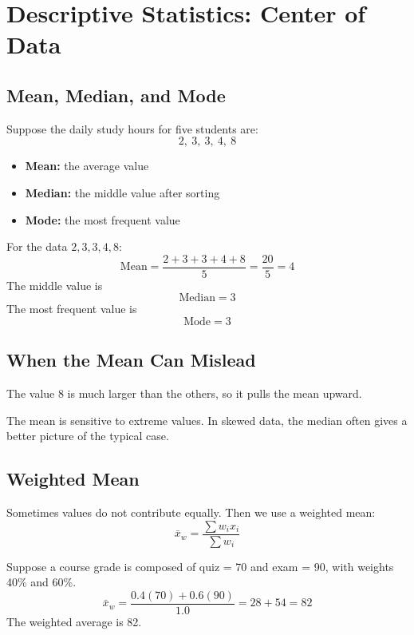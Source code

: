 \documentclass[11pt,a4paper]{article}
\begin{document}
\section{Descriptive Statistics: Center of Data}

\subsection{Mean, Median, and Mode}

Suppose the daily study hours for five students are:
\[
2,\ 3,\ 3,\ 4,\ 8
\]

\begin{itemize}[leftmargin=*]
  \item \textbf{Mean:} the average value
  \item \textbf{Median:} the middle value after sorting
  \item \textbf{Mode:} the most frequent value
\end{itemize}

\begin{examplebox}
For the data $2, 3, 3, 4, 8$:
\[
\text{Mean} = \frac{2+3+3+4+8}{5} = \frac{20}{5} = 4
\]
The middle value is
\[
\text{Median} = 3
\]
The most frequent value is
\[
\text{Mode} = 3
\]
\end{examplebox}

\subsection{When the Mean Can Mislead}

The value 8 is much larger than the others, so it pulls the mean upward.

\begin{alertbox}
The mean is sensitive to extreme values. In skewed data, the median often gives a better picture of the typical case.
\end{alertbox}

\subsection{Weighted Mean}

Sometimes values do not contribute equally. Then we use a weighted mean:
\[
\bar{x}_w = \frac{\sum w_ix_i}{\sum w_i}
\]

\begin{examplebox}
Suppose a course grade is composed of quiz = 70 and exam = 90, with weights 40\% and 60\%.
\[
\bar{x}_w = \frac{0.4(70) + 0.6(90)}{1.0} = 28 + 54 = 82
\]
The weighted average is 82.
\end{examplebox}
\end{document}

